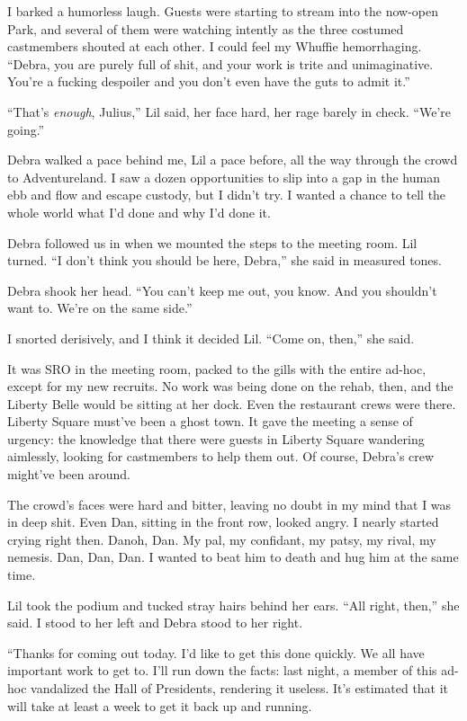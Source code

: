 I barked a humorless laugh. Guests were starting to stream into the
now-open Park, and several of them were watching intently as the
three costumed castmembers shouted at each other. I could feel my
Whuffie hemorrhaging. “Debra, you are purely full of shit, and your
work is trite and unimaginative. You're a fucking despoiler and you
don't even have the guts to admit it.”

“That's \emph{enough}, Julius,” Lil said, her face hard, her rage
barely in check. “We're going.”

Debra walked a pace behind me, Lil a pace before, all the way
through the crowd to Adventureland. I saw a dozen opportunities to
slip into a gap in the human ebb and flow and escape custody, but I
didn't try. I wanted a chance to tell the whole world what I'd done
and why I'd done it.

Debra followed us in when we mounted the steps to the meeting room.
Lil turned. “I don't think you should be here, Debra,” she said in
measured tones.

Debra shook her head. “You can't keep me out, you know. And you
shouldn't want to. We're on the same side.”

I snorted derisively, and I think it decided Lil. “Come on, then,”
she said.

It was SRO in the meeting room, packed to the gills with the entire
ad-hoc, except for my new recruits. No work was being done on the
rehab, then, and the Liberty Belle would be sitting at her dock.
Even the restaurant crews were there. Liberty Square must've been a
ghost town. It gave the meeting a sense of urgency: the knowledge
that there were guests in Liberty Square wandering aimlessly,
looking for castmembers to help them out. Of course, Debra's crew
might've been around.

The crowd's faces were hard and bitter, leaving no doubt in my mind
that I was in deep shit. Even Dan, sitting in the front row, looked
angry. I nearly started crying right then. Dan{\dash}oh, Dan. My pal, my
confidant, my patsy, my rival, my nemesis. Dan, Dan, Dan. I wanted
to beat him to death and hug him at the same time.

Lil took the podium and tucked stray hairs behind her ears. “All
right, then,” she said. I stood to her left and Debra stood to her
right.

“Thanks for coming out today. I'd like to get this done quickly. We
all have important work to get to. I'll run down the facts: last
night, a member of this ad-hoc vandalized the Hall of Presidents,
rendering it useless. It's estimated that it will take at least a
week to get it back up and running.


